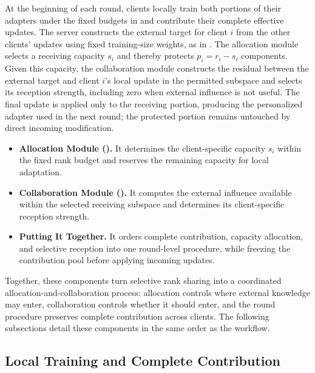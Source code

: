 At the beginning of each round, clients locally train both portions of their
adapters under the fixed budgets in  and
contribute their complete effective updates.
The server constructs the external target for client $i$ from the other clients'
updates using fixed training-size weights, as in .
The allocation module selects a receiving capacity $s_i$ and thereby protects
$p_i=r_i-s_i$ components.
Given this capacity, the collaboration module constructs the residual between
the external target and client $i$'s local update in the permitted subspace and
selects its reception strength, including zero when external influence is not
useful.
The final update is applied only to the receiving portion, producing the
personalized adapter used in the next round; the protected portion remains
untouched by direct incoming modification.

\begin{itemize}
    \item \textbf{Allocation Module ().}
    It determines the client-specific capacity $s_i$ within the fixed rank
    budget and reserves the remaining capacity for local adaptation.
    \item \textbf{Collaboration Module ().}
    It computes the external influence available within the selected receiving
    subspace and determines its client-specific reception strength.
    \item \textbf{Putting It Together.}
    It orders complete contribution, capacity allocation, and selective reception
    into one round-level procedure, while freezing the contribution pool before
    applying incoming updates.
\end{itemize}

Together, these components turn selective rank sharing into a coordinated
allocation-and-collaboration process: allocation controls where external
knowledge may enter, collaboration controls whether it should enter, and the
round procedure preserves complete contribution across clients.
The following subsections detail these components in the same order as the
workflow.

\subsection{Local Training and Complete Contribution}
\label{sec:method:contribution}

